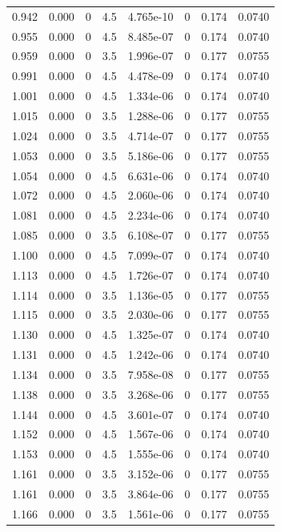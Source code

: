 \documentclass[preview]{standalone}
\begin{document}
{{{\begin{tabular}{L{1.2cm}C{1.2cm} C{0.3cm}C{0.5cm} C{1.4cm}C{1.4cm} C{1.4cm}C{1.4cm}}
  0.942  &  0.000  & 0     & 4.5 &  4.765e-10  & 0  & 0.174 &  0.0740   \\ 
  0.955  &  0.000  & 0     & 4.5 &  8.485e-07  & 0  & 0.174 &  0.0740   \\ 
  0.959  &  0.000  & 0     & 3.5 &  1.996e-07  & 0  & 0.177 &  0.0755   \\ 
  0.991  &  0.000  & 0     & 4.5 &  4.478e-09  & 0  & 0.174 &  0.0740   \\ 
  1.001  &  0.000  & 0     & 4.5 &  1.334e-06  & 0  & 0.174 &  0.0740   \\ 
  1.015  &  0.000  & 0     & 3.5 &  1.288e-06  & 0  & 0.177 &  0.0755   \\ 
  1.024  &  0.000  & 0     & 3.5 &  4.714e-07  & 0  & 0.177 &  0.0755   \\ 
  1.053  &  0.000  & 0     & 3.5 &  5.186e-06  & 0  & 0.177 &  0.0755   \\ 
  1.054  &  0.000  & 0     & 4.5 &  6.631e-06  & 0  & 0.174 &  0.0740   \\ 
  1.072  &  0.000  & 0     & 4.5 &  2.060e-06  & 0  & 0.174 &  0.0740   \\ 
  1.081  &  0.000  & 0     & 4.5 &  2.234e-06  & 0  & 0.174 &  0.0740   \\ 
  1.085  &  0.000  & 0     & 3.5 &  6.108e-07  & 0  & 0.177 &  0.0755   \\ 
  1.100  &  0.000  & 0     & 4.5 &  7.099e-07  & 0  & 0.174 &  0.0740   \\ 
  1.113  &  0.000  & 0     & 4.5 &  1.726e-07  & 0  & 0.174 &  0.0740   \\ 
  1.114  &  0.000  & 0     & 3.5 &  1.136e-05  & 0  & 0.177 &  0.0755   \\ 
  1.115  &  0.000  & 0     & 3.5 &  2.030e-06  & 0  & 0.177 &  0.0755   \\ 
  1.130  &  0.000  & 0     & 4.5 &  1.325e-07  & 0  & 0.174 &  0.0740   \\ 
  1.131  &  0.000  & 0     & 4.5 &  1.242e-06  & 0  & 0.174 &  0.0740   \\ 
  1.134  &  0.000  & 0     & 3.5 &  7.958e-08  & 0  & 0.177 &  0.0755   \\ 
  1.138  &  0.000  & 0     & 3.5 &  3.268e-06  & 0  & 0.177 &  0.0755   \\ 
  1.144  &  0.000  & 0     & 4.5 &  3.601e-07  & 0  & 0.174 &  0.0740   \\ 
  1.152  &  0.000  & 0     & 4.5 &  1.567e-06  & 0  & 0.174 &  0.0740   \\ 
  1.153  &  0.000  & 0     & 4.5 &  1.555e-06  & 0  & 0.174 &  0.0740   \\ 
  1.161  &  0.000  & 0     & 3.5 &  3.152e-06  & 0  & 0.177 &  0.0755   \\ 
  1.161  &  0.000  & 0     & 3.5 &  3.864e-06  & 0  & 0.177 &  0.0755   \\ 
  1.166  &  0.000  & 0     & 3.5 &  1.561e-06  & 0  & 0.177 &  0.0755   \\ 
\hline 
\end{tabular} 

}}}
\end{document}
